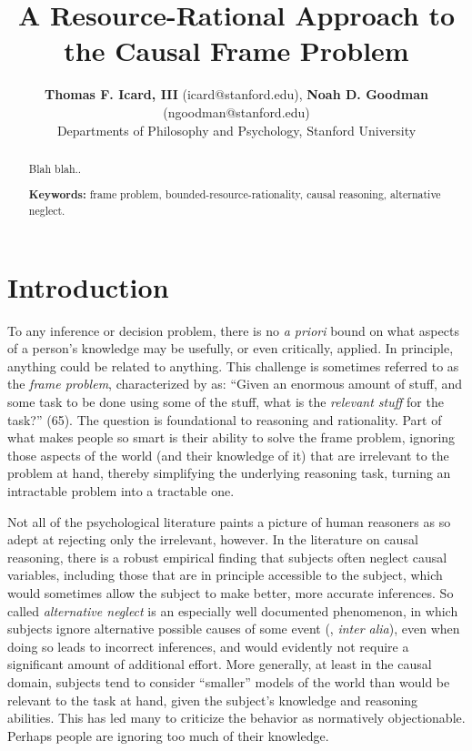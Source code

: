 \documentclass[10pt,letterpaper]{article}
\title{A Resource-Rational Approach to the Causal Frame Problem}
\author{{\large \bf Thomas F. Icard, III} (icard@stanford.edu), {\large \bf Noah D. Goodman} (ngoodman@stanford.edu)\\
  Departments of Philosophy and Psychology, Stanford University}
\begin{document}
\maketitle


\begin{abstract}
Blah blah.. \vspace{2.2in}

\textbf{Keywords:} 
frame problem, bounded-resource-rationality, causal reasoning, alternative neglect.
\end{abstract}

\section{Introduction}

To any inference or decision problem, there is no \emph{a priori} bound on what aspects of a person's knowledge may be usefully, or even critically, applied. In principle, anything could be related to anything. 
This challenge is sometimes referred to as the \emph{frame problem}, characterized by \cite{Glymour1987} as: ``Given an enormous amount of stuff, and some task to be done using some of the stuff, what is the \emph{relevant stuff} for the task?'' (65). The question is foundational to reasoning and rationality. 
Part of what makes people so smart is their ability to solve the frame problem, ignoring those aspects of the world (and their knowledge of it) that are irrelevant to the problem at hand, thereby simplifying the underlying reasoning task, turning an intractable problem into a tractable one.

Not all of the psychological literature paints a picture of human reasoners as so adept at rejecting only the irrelevant, however. In the literature on causal reasoning, there is a robust empirical finding that subjects often neglect causal variables, including those that are in principle accessible to the subject, which would sometimes allow the subject to make better, more accurate inferences. So called \emph{alternative neglect} is an especially well documented phenomenon, in which subjects ignore alternative possible causes of some event (\citealt{Fischhoff1978,KlaymanHa,Fernbach2011}, \emph{inter alia}), even when doing so leads to incorrect inferences, and would evidently not require a significant  amount of additional effort. More generally, at least in the causal domain, subjects tend to consider ``smaller'' models of the world than would be relevant to the task at hand, given the subject's knowledge and reasoning abilities. This has led many to criticize the behavior as normatively objectionable. Perhaps people are ignoring too much of their knowledge.
\end{document}
